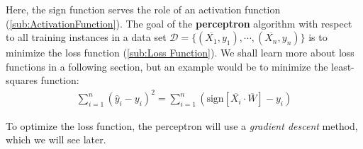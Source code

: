 \documentclass{article}
\begin{document}
Here, the sign function serves the role of an activation function (\autoref{sub:ActivationFunction}). The goal of the \textbf{perceptron} algorithm with respect to all training instances in a data set $\mathcal{D} = \{(\overline{X_1}, y_1 ), \cdots,(\overline{X_n}, y_n )\}$ is to minimize the loss function (\autoref{sub:Loss Function}). We shall learn more about loss functions in a following section, but an example would be to minimize the least-squares function: 
 \begin{equation*}
  \begin{split}
    \sum^{n}_{i=1} (\hat y_i - y_i)^2 =\sum^{n}_{i=1} \left(\text{sign}[\overline{X_i} \cdot \overline{W}] -y_i \right)
  \end{split}
 \end{equation*}

 To optimize the loss function, the perceptron will use a \textit{gradient descent} method, which we will see later.
\end{document}

